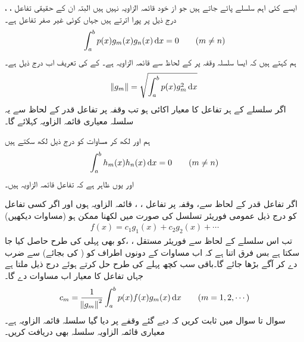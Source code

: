 ایسے کئی اہم سلسلے پائے جاتے ہیں جو از خود قائمہ الزاویہ نہیں ہیں البتہ ان کے حقیقی تفاعل ، ،   درج ذیل پر پورا اترتے ہیں جہاں  کوئی غیر صفر تفاعل ہے۔
\begin{align}\label{مساوات_طاقتی_اضافی_عمودی_تفاعل_قدر_الف}
\int_{a}^{b} p(x) g_m(x)g_n(x)\dif x=0\quad \quad (m\ne n)
\end{align}  
ہم کہتے ہیں کہ ایسا سلسلہ وقفہ  پر   کے لحاظ سے قائمہ الزاویہ ہے۔ کے  کی تعریف اب درج ذیل ہے۔
\begin{align}\label{مساوات_طاقتی_اضافی_معیار_قدر_تفاعل}
\norm{g_m}=\sqrt{\int_{a}^{b}p(x)g_m^2\dif x}
\end{align}
اگر سلسلے کے ہر تفاعل  کا معیار اکائی  ہو تب وقفہ  پر تفاعل قدر  کے لحاظ سے یہ سلسلہ معیاری قائمہ الزاویہ کہلائے گا۔

ہم  اور  لکھ کر مساوات  کو درج ذیل لکھ سکتے ہیں
\begin{align*}
\int_{a}^{b}h_m(x)h_n(x)\dif x=0 \quad \quad (m\ne n)
\end{align*}
اور یوں ظاہر ہے کہ  تفاعل قائمہ الزاویہ ہیں۔

اگر تفاعل قدر  کے لحاظ سے، وقفہ  پر تفاعل ، ،   قائمہ الزاویہ ہوں اور اگر کسی تفاعل  کو درج ذیل عمومی فوریئر تسلسل کی صورت میں لکھنا ممکن ہو (مساوات  دیکھیں)
\begin{align}\label{مساوات_ضمیمہ_اضافی_تفاعل_قدر_تسلسل_الف}
f(x)=c_1g_1(x)+c_2g_2(x)+\cdots
\end{align} 
 تب اس سلسلے کے لحاظ سے فوریئر مستقل ، ، کو بھی پہلی کی طرح حاصل کیا جا سکتا ہے بس فرق اتنا ہے کہ اب مساوات
  کے دونوں اطراف کو ( کی بجائے)  سے ضرب دے کر آگے بڑھا جائے گا۔باقی سب کچھ پہلے کی طرح حل کرتے ہوئے درج ذیل ملتا ہے جہاں تفاعل کا معیار اب مساوات  دے گا۔ 
\begin{align}\label{مساوات_ضمیمہ_اضافی_تفاعل_قدر_تسلسل_عددی_سر}
c_m=\frac{1}{\norm{g_m}^2}\int_{a}^{b}p(x)f(x)g_m(x)\dif x\quad \quad (m=1,2,\cdots)
\end{align} 
سوال  تا سوال  میں ثابت کریں کہ دیے گئے وقفے پر دیا گیا سلسلہ قائمہ الزاویہ ہے۔معیاری قائمہ الزاویہ سلسلہ بھی دریافت کریں۔

